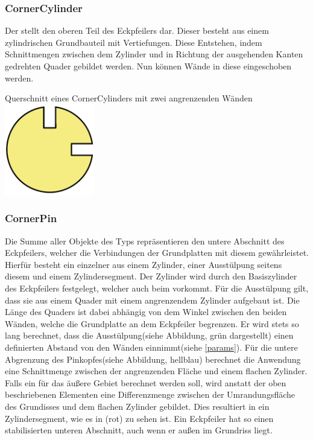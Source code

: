 \subsubsection{CornerCylinder}
Der  stellt den oberen Teil des Eckpfeilers dar.
Dieser besteht aus einem zylindrischen Grundbauteil mit Vertiefungen.
Diese Entstehen, indem Schnittmengen zwischen dem Zylinder und in Richtung der ausgehenden Kanten gedrehten Quader gebildet werden.
Nun können Wände in diese eingeschoben werden.
\begin{Bild}{Querschnitt eines CornerCylinders mit zwei angrenzenden Wänden}
	\includegraphics[height=150px]{Bilder/CornerCylinder2D-06.png}
\end{Bild}

\subsubsection{CornerPin}
Die Summe aller Objekte des Typs  repräsentieren den untere Abschnitt des Eckpfeilers, welcher die Verbindungen der Grundplatten mit diesem gewährleistet.
Hierfür besteht ein einzelner  aus einem Zylinder, einer Ausstülpung seitens diesem und einem Zylindersegment.
Der Zylinder wird durch den Basiszylinder des Eckpfeilers festgelegt, welcher auch beim  vorkommt.
Für die Ausstülpung gilt, dass sie aus einem Quader mit einem angrenzendem Zylinder aufgebaut ist.
Die Länge des Quaders ist dabei abhängig von dem Winkel zwischen den beiden Wänden, welche die Grundplatte an dem Eckpfeiler begrenzen.
Er wird stets so lang berechnet, dass die Ausstülpung(siehe Abbildung, grün dargestellt) einen definierten Abstand von den Wänden einnimmt(siehe \ref{params}).
Für die untere Abgrenzung des Pinkopfes(siehe Abbildung, hellblau) berechnet die Anwendung eine Schnittmenge zwischen der angrenzenden Fläche und einem flachen Zylinder.\\
Falls ein  für das äußere Gebiet berechnet werden soll, wird anstatt der oben beschriebenen Elementen eine Differenzmenge zwischen der Umrandungsfläche des Grundisses und dem flachen Zylinder gebildet.
Dies resultiert in ein Zylindersegment, wie es in (rot) zu sehen ist.
Ein Eckpfeiler hat so einen stabilisierten unteren Abschnitt, auch wenn er außen im Grundriss liegt.

